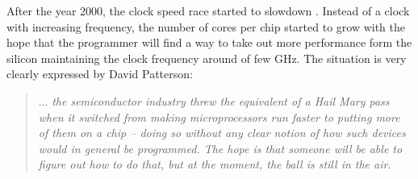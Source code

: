 After the year 2000, the clock speed race started to slowdown \citep{Asanovic06, Asanovic09}. Instead of a clock with increasing frequency, the number of cores per chip started to grow with the hope that the programmer will find a way to take out more performance form the silicon maintaining the clock frequency around  of few GHz.  The situation is very clearly expressed by David Patterson:
\begin{quote}
$\ldots$ {\em the semiconductor industry threw the equivalent of a Hail Mary pass when it switched from making microprocessors run faster to putting more of them on a chip -- doing so without any clear notion of how such devices would in general be programmed. The hope is that someone will be able to figure out how to do that, but at the moment, the ball is still in the air}. \citep{Patterson10}
\end{quote}

